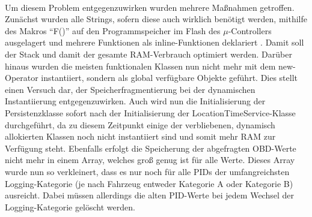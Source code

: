 \paragraph{}
Um diesem Problem entgegenzuwirken wurden mehrere Maßnahmen getroffen. Zunächst wurden alle Strings, sofern diese auch wirklich benötigt werden, mithilfe des Makros \enquote{F()} auf den Programmspeicher im Flash des $\mu$-Controllers ausgelagert und mehrere Funktionen als inline-Funktionen deklariert \cite{ardRAMopt}. Damit soll der Stack und damit der gesamte RAM-Verbrauch optimiert werden. Darüber hinaus wurden die meisten funktionalen Klassen nun nicht mehr mit dem new-Operator instantiiert, sondern als global verfügbare Objekte geführt. Dies stellt einen Versuch dar, der Speicherfragmentierung bei der dynamischen Instantiierung entgegenzuwirken. Auch wird nun die Initialisierung der Persistenzklasse sofort nach der Initialisierung der LocationTimeService-Klasse durchgeführt, da zu diesem Zeitpunkt einige der verbliebenen, dynamisch allokierten Klassen noch nicht instantiiert sind und somit mehr RAM zur Verfügung steht.
Ebenfalls erfolgt die Speicherung der abgefragten OBD-Werte nicht mehr in einem Array, welches groß genug ist für alle Werte. Dieses Array wurde nun so verkleinert, dass es nur noch für alle PIDs der umfangreichsten Logging-Kategorie (je nach Fahrzeug entweder Kategorie A oder Kategorie B) ausreicht. Dabei müssen allerdings die alten PID-Werte bei jedem Wechsel der Logging-Kategorie gelöscht werden.

